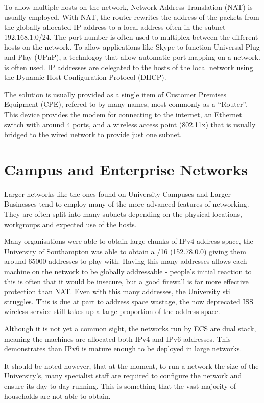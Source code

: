 \documentclass[12pt]{report}
\begin{document}
To allow multiple hosts on the network, Network Address Translation (NAT) is
usually employed. With NAT, the router rewrites the address of the packets from
the globally allocated IP address to a local address often in the subnet
192.168.1.0/24. The port number is often used to multiplex between the
different hosts on the network. To allow applications like Skype to function
Universal Plug and Play (UPnP), a technlogoy that allow automatic port mapping on a 
network. is often used. IP addresses are delegated to the hosts of the local
network using the Dynamic Host Configuration Protocol (DHCP). 

The solution is usually provided as a single item of Customer Premises
Equipment (CPE), refered to by many names, most commonly as a ``Router''.
This device provides the modem for connecting to the
internet, an Ethernet switch with around 4 ports, and a wireless access point
(802.11x) that is usually bridged to the wired network to provide just one
subnet. 

\section{Campus and Enterprise Networks}
Larger networks like the ones found on University Campuses and Larger
Businesses tend to employ many of the more advanced features of networking.
They are often split into many subnets depending on the physical locations,
workgroups and expected use of the hosts. 

Many organisations were able to obtain large chunks of IPv4 address space, the
University of Southampton was able to obtain a /16 (152.78.0.0) giving them
around 65000 addresses to play with. Having this many addresses allows each
machine on the network to be globally addressable - people's initial reaction
to this is often that it would be insecure, but a good firewall is far more
effective protection than NAT. Even with this many addresses, the University
still struggles. This is due at part to address space wastage, the now
deprecated ISS wireless service still takes up a large proportion of the
address space. 

Although it is not yet a common sight, the networks run by ECS are dual stack,
meaning the machines are allocated both IPv4 and IPv6 addresses. This
demonstrates than IPv6 is mature enough to be deployed in large networks.

It should be noted however, that at the moment, to run a network the size of
the University's, many specialist staff are required to configure the network
and ensure its day to day running. This is something that the vast majority of
households are not able to obtain.
\end{document}
